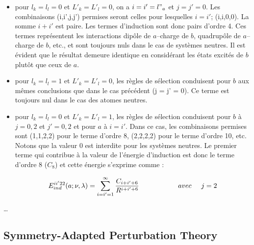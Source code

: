 \documentclass[12pt,a4paper]{book}
\begin{document}
	\begin{itemize}
		\item pour $l_{k}=l_{l}=0$ et  $L'_{k}=L'_{l}=0$, on a $i=i'=l"_{a}$ et $j=j'=0$. Les combinaisons (i,i',j,j') permises seront celles pour lesquelles $i = i'$; (i,i,0,0). La somme $i + i'$ est paire. Les termes d'induction sont donc pairs d'ordre 4. Ces termes représentent les interactions dipôle de $a$--charge de $b$, quadrupôle de $a$--charge de $b$, etc., et sont toujours nuls dans le cas de systèmes neutres. Il est évident que le résultat demeure identique en considérant les états excités de $b$ plutôt que ceux de $a$. 
		\item pour $l_{k} = l_{l} = 1 $ et  $L'_{k} = L'_{l} = 0$, les règles de sélection conduisent pour $b$ aux mêmes conclusions que dans le cas précédent (j = j' = 0). Ce terme est toujours nul dans le cas des atomes neutres.
		\item pour $l_{k} = l_{l} = 0 $ et  $L'_{k} = L'_{l} = 1$, les règles de sélection conduisent pour $b$ à $j=0, 2$ et $j'=0, 2$ et pour $a$ à $i = i'$. Dans ce cas, les combinaisons permises sont (1,1,2,2) pour le terme d'ordre 8, (2,2,2,2) pour le terme d'ordre 10, etc. Notons que la valeur 0 est interdite pour les systèmes neutres. Le premier terme qui contribue à la valeur de l'énergie d'induction est donc le terme d'ordre 8 ($C_{8}$) et cette énergie s'exprime comme : 
		
		\begin{equation}
		E_{ind}^{ii'22} (a;\nu , \lambda) = \sum_{i=i'=1}^{\infty} \frac{C_{i+i'+6}}{R^{i+i'+6}} \hspace{2cm} avec \hspace{0.5cm} j = 2
		\end{equation}
		
	\end{itemize}
	
	\ldots
	
	
	\subsection[SAPT]{Symmetry-Adapted Perturbation Theory}
	
\end{document}
